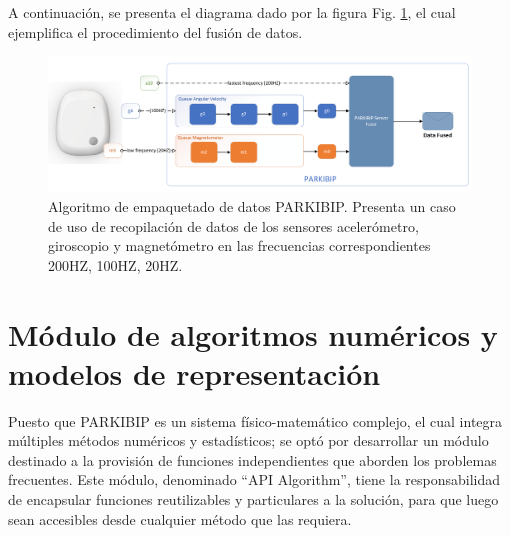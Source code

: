 A continuación, se presenta el diagrama dado por la figura Fig. \ref{FIG: sensor-fuser}, el cual ejemplifica el procedimiento del fusión de datos.

\begin{figure}[H]
    \centering
    \includegraphics[clip,width=1.1 \columnwidth]{TESIS/imagenes/chap05/sensor-fuser.PNG}
    \caption{Algoritmo de empaquetado de datos PARKIBIP. Presenta un caso de uso de recopilación de datos de los sensores acelerómetro, giroscopio y magnetómetro en las frecuencias correspondientes 200HZ, 100HZ, 20HZ.}
    \label{FIG: sensor-fuser}
\end{figure}

\section{Módulo de algoritmos numéricos y modelos de representación}\label{API-algoritmos} 

Puesto que PARKIBIP es un sistema físico-matemático complejo, el cual integra múltiples métodos numéricos y estadísticos; se optó por desarrollar un módulo destinado a la provisión de funciones independientes que aborden los problemas frecuentes. Este módulo, denominado ``API Algorithm'', tiene la responsabilidad de encapsular funciones reutilizables y particulares a la solución, para que luego sean accesibles desde cualquier método que las requiera.

